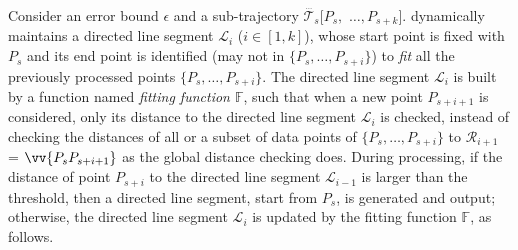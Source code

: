 Consider an error bound $\epsilon$ and a sub-trajectory $\dddot{\mathcal{T}_s}[P_s,$ $\ldots, P_{s+k}]$.
\operb dynamically maintains a directed line segment $\mathcal{L}_i$ ($i\in[1,k]$), whose start point is fixed with $P_s$ and its end point is identified (may not in $\{P_s, \ldots, P_{s+i}\}$) to {\em fit} all the previously processed points $\{P_s, \ldots, P_{s+i}\}$.
The directed line segment $\mathcal{L}_i$ is built by a function named \emph{fitting function $\mathbb{F}$}, such that when a new point $P_{s+i+1}$ is considered, only its distance to the directed line segment $\mathcal{L}_i$ is checked, instead of checking the distances of all or a subset of data points of $\{P_{s}, \ldots, P_{s+i}\}$ to $\mathcal{R}_{i+1}$ = $\vv{P_sP_{s+i+1}}$ as the global distance checking does.
During processing, if the distance of point $P_{s+i}$ to the directed line segment $\mathcal{L}_{i-1}$ is larger than the threshold, then a directed line segment, start from $P_s$, is generated and output;
otherwise, the directed line segment $\mathcal{L}_i$ is updated by the fitting function $\mathbb{F}$, as follows.

